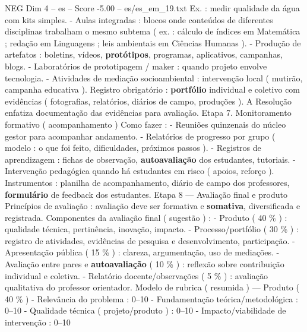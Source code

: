 \begin{textsample}{NEG Dim 4 – es – Score -5.00 – es/es\_em\_19.txt}
Ex. : medir qualidade da água com kits simples. - Aulas integradas : blocos onde conteúdos de diferentes disciplinas trabalham o mesmo subtema ( ex. : cálculo de índices em Matemática ; redação em Linguagens ; leis ambientais em Ciências Humanas ). - Produção de artefatos : boletins, vídeos, \textbf{protótipos}, programas, aplicativos, campanhas, blogs. - Laboratórios de prototipagem / maker : quando projeto envolve tecnologia. - Atividades de mediação socioambiental : intervenção local ( mutirão, campanha educativa ).
Registro obrigatório : \textbf{portfólio} individual e coletivo com evidências ( fotografias, relatórios, diários de campo, produções ).
A Resolução enfatiza documentação das evidências para avaliação.
Etapa 7.
Monitoramento formativo ( acompanhamento ) Como fazer : - Reuniões quinzenais do núcleo gestor para acompanhar andamento. - Relatórios de progresso por grupo ( modelo : o que foi feito, dificuldades, próximos passos ). - Registros de aprendizagem : fichas de observação, \textbf{autoavaliação} dos estudantes, tutoriais. - Intervenção pedagógica quando há estudantes em risco ( apoios, reforço ).
Instrumentos : planilha de acompanhamento, diário de campo dos professores, \textbf{formulário} de feedback dos estudantes.
Etapa 8 — Avaliação final e produto Princípios de avaliação : avaliação deve ser formativa e \textbf{somativa}, diversificada e registrada.
Componentes da avaliação final ( sugestão ) : - Produto ( 40 \% ) : qualidade técnica, pertinência, inovação, impacto. - Processo/portfólio ( 30 \% ) : registro de atividades, evidências de pesquisa e desenvolvimento, participação. - Apresentação pública ( 15 \% ) : clareza, argumentação, uso de mediações. - Avaliação entre pares e \textbf{autoavaliação} ( 10 \% ) : reflexão sobre contribuição individual e coletiva. - Relatório docente/observações ( 5 \% ) : avaliação qualitativa do professor orientador.
Modelo de rubrica ( resumida ) — Produto ( 40 \% ) - Relevância do problema : 0–10 - Fundamentação teórica/metodológica : 0–10 - Qualidade técnica ( projeto/produto ) : 0–10 - Impacto/viabilidade de intervenção : 0–10

\end{textsample}
